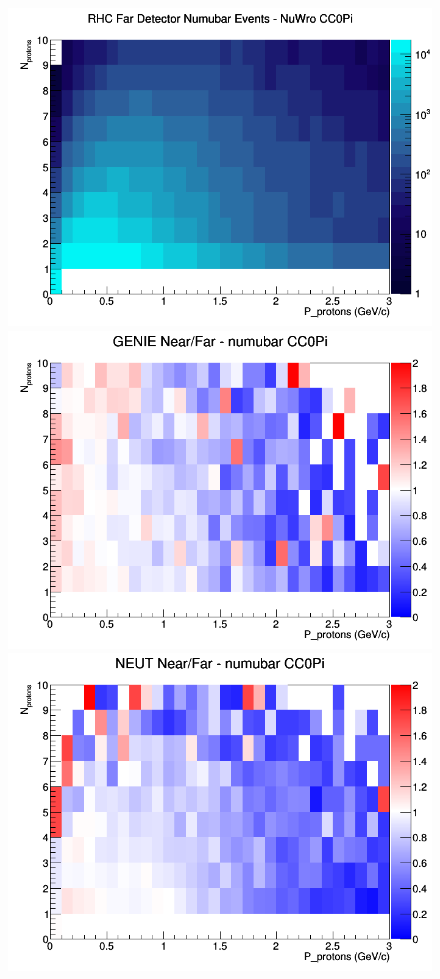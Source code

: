 \begin{figure}[h]
\endminipage
{}
\includegraphics[width=\linewidth]{N_P/nominal/protons/CC0Pi_RHC_FD_numubar_N_P_NuWro.png}
\endminipage
\newline
{}
\includegraphics[width=\linewidth]{N_P/nominal/protons/ratios/CC0Pi_GENIE_numubar_NF_N_P.png}
\endminipage
{}
\includegraphics[width=\linewidth]{N_P/nominal/protons/ratios/CC0Pi_NEUT_numubar_NF_N_P.png}

\end{figure}
